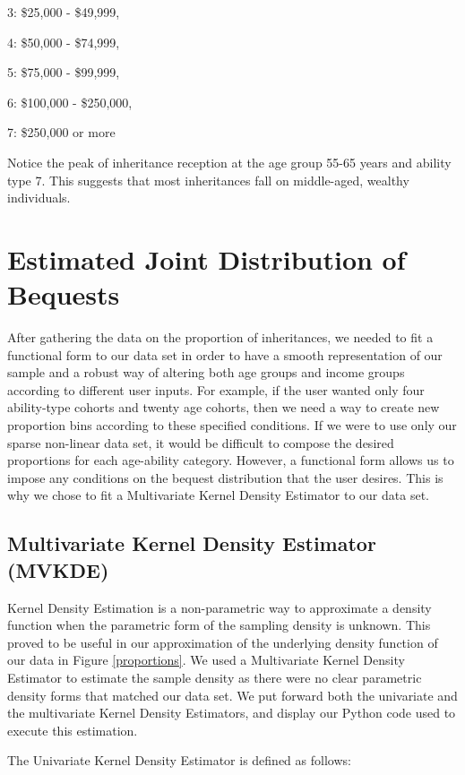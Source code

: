 \documentclass[letterpaper,12pt]{article}
\theoremstyle{definition}
\begin{document}
\begin{spacing}{1.5}
  3: \$25,000 - \$49,999,

  4: \$50,000 - \$74,999,

  5: \$75,000 - \$99,999,

  6: \$100,000 - \$250,000,

  7: \$250,000 or more

  Notice the peak of inheritance reception at the age group 55-65 years and ability type 7. This suggests that most inheritances fall on middle-aged, wealthy individuals.

\section{Estimated Joint Distribution of Bequests}\label{SecDist}

  After gathering the data on the proportion of inheritances, we needed to fit a functional form to our data set in order to have a smooth representation of our sample and a robust way of altering both age groups and income groups according to different user inputs. For example, if the user wanted only four ability-type cohorts and twenty age cohorts, then we need a way to create new proportion bins according to these specified conditions. If we were to use only our sparse non-linear data set, it would be difficult to compose the desired proportions for each age-ability category. However, a functional form allows us to impose any conditions on the bequest distribution that the user desires. This is why we chose to fit a Multivariate Kernel Density Estimator to our data set.


  \subsection{Multivariate Kernel Density Estimator (MVKDE)}\label{SecDistMVKDE}

    Kernel Density Estimation is a non-parametric way to approximate a density function when the parametric form of the sampling density is unknown. This proved to be useful in our approximation of the underlying density function of our data in Figure \ref{proportions}. We used a Multivariate Kernel Density Estimator to estimate the sample density as there were no clear parametric density forms that matched our data set. We put forward both the univariate and the multivariate Kernel Density Estimators, and display our Python code used to execute this estimation.

    The Univariate Kernel Density Estimator is defined as follows:


\end{spacing}
\end{document}
